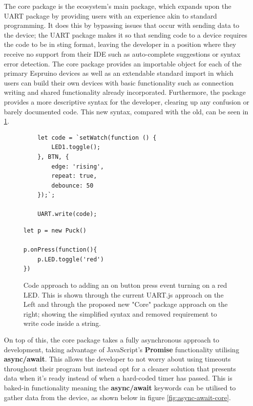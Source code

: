 \documentclass{l4proj}
\begin{document}
The core package is the ecosystem's main package, which expands upon the UART package by providing users with an experience akin to standard programming. It does this by bypassing issues that occur with sending data to the device; the UART package makes it so that sending code to a device requires the code to be in sting format, leaving the developer in a position where they receive no support from their IDE such as auto-complete suggestions or syntax error detection. The core package provides an importable object for each of the primary Espruino devices as well as an extendable standard import in which users can build their own devices with basic functionality such as connection writing and shared functionality already incorporated. Furthermore, the package provides a more descriptive syntax for the developer, clearing up any confusion or barely documented code. This new syntax, compared with the old, can be seen in \ref{fig:code_approach}.

\begin{figure}[!ht]
\centering
\begin{minipage}{6cm}
  \centering
  \begin{lstlisting}
    let code = `setWatch(function () {
        LED1.toggle();
    }, BTN, {
        edge: 'rising',
        repeat: true,
        debounce: 50
    });`;

    UART.write(code);
  \end{lstlisting}
\end{minipage}
\hspace{1cm}
\begin{minipage}{6cm}
  \centering
  
  \begin{lstlisting}
let p = new Puck()

p.onPress(function(){
    p.LED.toggle('red')
})
  \end{lstlisting}
\end{minipage}
  \caption{Code approach to adding an on button press event turning on a red LED. This is shown through the current UART.js approach on the Left and through the proposed new "Core" package approach on the right; showing the simplified syntax and removed requirement to write code inside a string.}
  \label{fig:code_approach}
\end{figure}

On top of this, the core package takes a fully asynchronous approach to development, taking advantage of JavaScript's \textbf{Promise} functionality utilising \textbf{async/await}. This allows the developer to not worry about using timeouts throughout their program but instead opt for a cleaner solution that presents data when it's ready instead of when a hard-coded timer has passed. This is baked-in functionality meaning the \textbf{async/await} keywords can be utilised to gather data from the device, as shown below in figure \ref{fig:async-await-core}.
\end{document}
